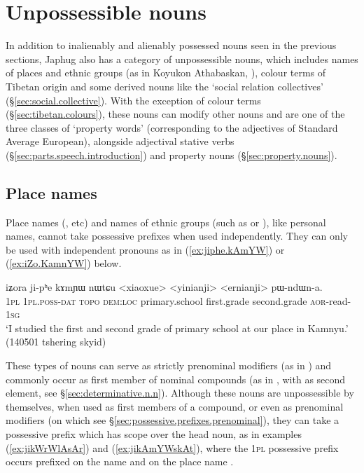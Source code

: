  

\section{Unpossessible nouns} \label{sec:unpossessible.nouns}
In addition to inalienably and alienably possessed nouns seen in the previous sections, Japhug also has a category of unpossessible nouns, which includes names of places and ethnic groups (as in Koyukon Athabaskan, \citealt[651]{thompson96koyukon}), colour terms of Tibetan origin and some derived nouns like the `social relation collectives' (§\ref{sec:social.collective}). With the exception of colour terms (§\ref{sec:tibetan.colours}), these nouns can modify other nouns and are one of the three classes of `property words' (corresponding to the adjectives of Standard Average European), alongside adjectival stative verbs (§\ref{sec:parts.speech.introduction}) and property nouns (§\ref{sec:property.nouns}).

 

\subsection{Place names} \label{sec:place.names}
Place names (,  etc) and names of ethnic groups (such as  or ), like personal names, cannot take possessive prefixes when used independently. They can only be used with independent pronouns as in (\ref{ex:jiphe.kAmYW}) or (\ref{ex:iZo.KamnYW}) below.
\largerpage
\begin{exe}
\ex \label{ex:jiphe.kAmYW}
\gll  iʑora ji-pʰe kɤmɲɯ nɯtɕu <xiaoxue> <yinianji> <ernianji> pɯ-ndɯn-a. \\
\textsc{1pl} \textsc{1pl}.\textsc{poss}-\textsc{dat} \textsc{topo} \textsc{dem}:\textsc{loc} primary.school first.grade second.grade \textsc{aor}-read-\textsc{1sg} \\
\glt `I studied the first and second grade of primary school at our place in Kamnyu.' (140501 tshering skyid) 
\end{exe}

These types of nouns can serve as strictly prenominal modifiers (as in ) and commonly occur as first member of nominal compounds (as in , with  as second element, see §\ref{sec:determinative.n.n}). Although these nouns are unpossessible by themselves, when used as first members of a compound, or even as prenominal modifiers (on which see §\ref{sec:possessive.prefixes.prenominal}), they can take a possessive prefix which has scope over the head noun, as in examples (\ref{ex:jikWrWlAsAr}) and (\ref{ex:jikAmYWskAt}), where the \textsc{1pl} possessive prefix  occurs prefixed on the name  and on the place name .

